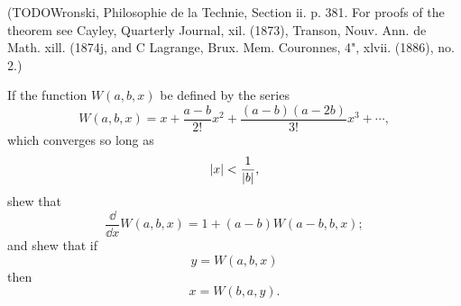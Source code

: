 \begin{wandwmiscexamples}
\begin{wandwmiscexample}
    (TODOWronski, Philosophie de la Technie, Section ii. p. 381. For proofs of
    the theorem see Cayley, Quarterly Journal, xil. (1873), Transon, Nouv.
    Ann. de Math. xill. (1874j, and C Lagrange, Brux. Mem. Couronnes, 4",
    xlvii. (1886), no. 2.)
  \end{wandwmiscexample}
  \begin{wandwmiscexample}
    If the function $W(a, b, x)$ be defined by the series
    $$
    W(a,b,x)
    =
    x
    + \frac{a-b}{2!} x^{2}
    + \frac{(a-b)(a-2b)}{3!} x^{3}
    + \cdots,
    $$
    which converges so long as
    $$
    \left| x \right| < \frac{1}{\left| b \right|},
    $$
    shew that
    $$
    \frac{\dd}{\dd x} W(a,b,x)
    =
    1
    +
    (a-b) W(a-b,b,x);
    $$
    and shew that if
    $$
    y = W(a,b,x)
    $$
    then
    $$
    x = W(b,a,y).
    $$


\end{wandwmiscexample}
\end{wandwmiscexamples}

